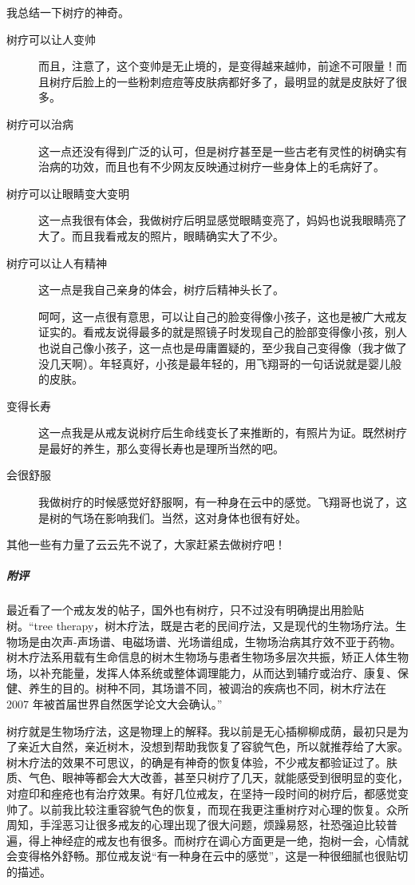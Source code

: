 \begin{case}[树疗]
    我总结一下树疗的神奇。\begin{description}
        \item[树疗可以让人变帅] 而且，注意了，这个变帅是无止境的，是变得越来越帅，前途不可限量！而且树疗后脸上的一些粉刺痘痘等皮肤病都好多了，最明显的就是皮肤好了很多。
        \item[树疗可以治病] 这一点还没有得到广泛的认可，但是树疗甚至是一些古老有灵性的树确实有治病的功效，而且也有不少网友反映通过树疗一些身体上的毛病好了。
        \item[树疗可以让眼睛变大变明] 这一点我很有体会，我做树疗后明显感觉眼睛变亮了，妈妈也说我眼睛亮了大了。而且我看戒友的照片，眼睛确实大了不少。
        \item[树疗可以让人有精神] 这一点是我自己亲身的体会，树疗后精神头长了。
        \item[] 呵呵，这一点很有意思，可以让自己的脸变得像小孩子，这也是被广大戒友证实的。看戒友说得最多的就是照镜子时发现自己的脸部变得像小孩，别人也说自己像小孩子，这一点也是毋庸置疑的，至少我自己变得像（我才做了没几天啊）。年轻真好，小孩是最年轻的，用飞翔哥的一句话说就是婴儿般的皮肤。
        \item[变得长寿] 这一点我是从戒友说树疗后生命线变长了来推断的，有照片为证。既然树疗是最好的养生，那么变得长寿也是理所当然的吧。
        \item[会很舒服] 我做树疗的时候感觉好舒服啊，有一种身在云中的感觉。飞翔哥也说了，这是树的气场在影响我们。当然，这对身体也很有好处。
    \end{description} 其他一些有力量了云云先不说了，大家赶紧去做树疗吧！
\end{case}

\subparagraph{附评} 最近看了一个戒友发的帖子，国外也有树疗，只不过没有明确提出用脸贴树。“tree therapy，树木疗法，既是古老的民间疗法，又是现代的生物场疗法。生物场是由次声-声场谱、电磁场谱、光场谱组成，生物场治病其疗效不亚于药物。树木疗法系用载有生命信息的树木生物场与患者生物场多层次共振，矫正人体生物场，以补充能量，发挥人体系统或整体调理能力，从而达到辅疗或治疗、康复、保健、养生的目的。树种不同，其场谱不同，被调治的疾病也不同，树木疗法在 2007 年被首届世界自然医学论文大会确认。”

树疗就是生物场疗法，这是物理上的解释。我以前是无心插柳柳成荫，最初只是为了亲近大自然，亲近树木，没想到帮助我恢复了容貌气色，所以就推荐给了大家。树木疗法的效果不可思议，的确是有神奇的恢复体验，不少戒友都验证过了。肤质、气色、眼神等都会大大改善，甚至只树疗了几天，就能感受到很明显的变化，对痘印和痤疮也有治疗效果。有好几位戒友，在坚持一段时间的树疗后，都感觉变帅了。以前我比较注重容貌气色的恢复，而现在我更注重树疗对心理的恢复。众所周知，手淫恶习让很多戒友的心理出现了很大问题，烦躁易怒，社恐强迫比较普遍，得上神经症的戒友也有很多。而树疗在调心方面更是一绝，抱树一会，心情就会变得格外舒畅。那位戒友说“有一种身在云中的感觉”，这是一种很细腻也很贴切的描述。

